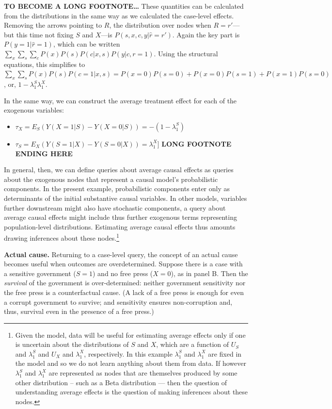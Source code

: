 \documentclass[12pt,]{book}
\providecommand{\tightlist}{%
  \setlength{\itemsep}{0pt}\setlength{\parskip}{0pt}}
\let\rmarkdownfootnote\footnote%
\def\footnote{\protect\rmarkdownfootnote}
\begin{document}
\textbf{TO BECOME A LONG FOOTNOTE\ldots{}}
These quantities can be calculated from the distributions in the same way as we calculated the case-level effects. Removing the arrows pointing to \(R\), the distribution over nodes when \(R=r'\)---but this time not fixing \(S\) and \(X\)---is \(P(s,x,c,y | \hat{r}=r')\). Again the key part is \(P(y=1| \hat{r}=1)\), which can be written \(\sum_x\sum_s\sum_c P(x)P(s)P(c|x,s)P(y|c, r= 1)\). Using the structural equations, this simplifies to \(\sum_x\sum_s P(x)P(s)P(c=1|x,s) = P(x=0)P(s=0) + P(x=0)P(s=1) + P(x=1)P(s=0)\), or, \(1-\lambda_1^S\lambda_1^X\).

In the same way, we can construct the average treatment effect for each of the exogenous variables:

\begin{itemize}
\tightlist
\item
  \(\tau_X = E_S(Y(X=1|S)-Y(X=0|S)) = -(1-\lambda_1^S)\)
\item
  \(\tau_S = E_X(Y(S=1|X)-Y(S=0|X)) = \lambda_1^X\){]}
  \textbf{LONG FOOTNOTE ENDING HERE}
\end{itemize}

In general, then, we can define queries about average causal effects as queries about the exogenous nodes that represent a causal model's probabilistic components. In the present example, probabilistic components enter only as determinants of the initial substantive causal variables. In other models, variables further downstream might also have stochastic components, a query about average causal effects might include thus further exogenous terms representing population-level distributions. Estimating average causal effects thus amounts drawing inferences about these nodes.\footnote{Given the model, data will be useful for estimating average effects only if one is uncertain about the distributions of \(S\) and \(X\), which are a function of \(U_S\) and \(\lambda_1^S\) and \(U_X\) and \(\lambda_1^X\), respectively. In this example \(\lambda_1^S\) and \(\lambda_1^X\) are fixed in the model and so we do not learn anything about them from data. If however \(\lambda_1^S\) and \(\lambda_1^X\) are represented as nodes that are themselves produced by some other distribution -- such as a Beta distribution --- then the question of understanding average effects is the question of making inferences about these nodes.}

\textbf{Actual cause.} Returning to a case-level query, the concept of an actual cause becomes useful when outcomes are overdetermined. Suppose there is a case with a sensitive government (\(S=1\)) and no free press (\(X=0\)), as in panel B. Then the \emph{survival} of the government is over-determined: neither government sensitivity nor the free press is a counterfactual cause. (A lack of a free press is enough for even a corrupt government to survive; and sensitivity ensures non-corruption and, thus, survival even in the presence of a free press.)
\end{document}

